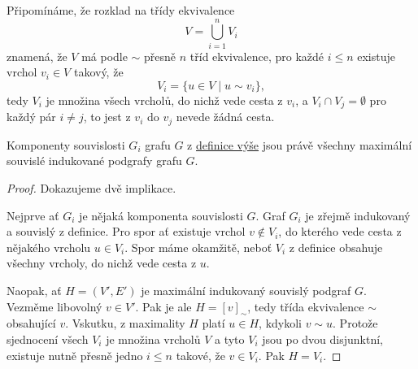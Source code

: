 \begin{remark}
 Připomínáme, že rozklad na třídy ekvivalence
 \[
  V = \bigcup_{i = 1}^{n} V_i
 \]
 znamená, že $V$ má podle $ \sim $ přesně $n$ tříd ekvivalence, pro každé $i
 \leq n$ existuje vrchol $v_i \in V$ takový, že
 \[
  V_i = \{u \in V \mid u \sim v_i\},
 \]
 tedy $V_i$ je množina všech vrcholů, do nichž vede cesta z $v_i$, a $V_i \cap
 V_j = \emptyset$ pro každý pár $i \neq j$, to jest z $v_i$ do $v_j$ nevede
 žádná cesta.
\end{remark}

\begin{observation}
 Komponenty souvislosti $G_i$ grafu $G$ z
 \hyperref[def:komponenta-souvislosti]{definice výše} jsou právě všechny
 maximální souvislé indukované podgrafy grafu $G$.
\end{observation}
\begin{proof}
 Dokazujeme dvě implikace.

 Nejprve ať $G_i$ je nějaká komponenta souvislosti $G$. Graf $G_i$ je zřejmě
 indukovaný a souvislý z definice. Pro spor ať existuje vrchol $v \notin V_i$,
 do kterého vede cesta z nějakého vrcholu $u \in V_i$. Spor máme okamžitě, neboť
 $V_i$ z definice obsahuje všechny vrcholy, do nichž vede cesta z $u$. 

 Naopak, ať $H = (V',E')$ je maximální indukovaný souvislý podgraf $G$. Vezměme
 libovolný $v \in V'$. Pak je ale $H = [v]_{ \sim }$, tedy třída ekvivalence $
 \sim $ obsahující $v$. Vskutku, z maximality $H$ platí $u \in H$, kdykoli $v
 \sim u$. Protože sjednocení všech $V_i$ je množina vrcholů $V$ a tyto $V_i$
 jsou po dvou disjunktní, existuje nutně přesně jedno $i \leq n$ takové, že $v
 \in V_i$. Pak $H = V_i$.
\end{proof}
